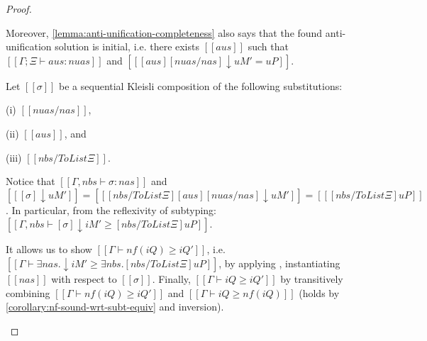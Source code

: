 \begin{proof}
\begin{caseof}
    Moreover, \cref{lemma:anti-unification-completeness} also says that the found anti-unification 
    solution is initial, i.e. there exists $[[aus]]$ such that
     $[[Γ;Ξ ⊢ aus : nuas]]$ and $[[ [aus][nuas/nas]↓uM' = uP ]]$.

     Let $[[σ]]$ be a sequential Kleisli composition of the following
     substitutions:
     \begin{enumerate*}
     \item[(i)] $[[nuas/nas]]$,
     \item[(ii)] $[[aus]]$, and
     \item[(iii)] $[[nbs / ToList Ξ]]$.
     \end{enumerate*}
     Notice that $[[Γ, nbs ⊢ σ : nas]]$
     and $[[ [σ]↓uM' ]] = [[ [nbs / ToList Ξ][aus][nuas/nas]↓uM' ]] = [[ [nbs /
     ToList Ξ]uP ]]$. In particular, from the reflexivity of subtyping:
     $[[Γ, nbs ⊢ [σ]↓iM' ≥ [nbs / ToList Ξ]uP]]$.

     It allows us to show $[[Γ ⊢ nf(iQ) ≥ iQ']]$, i.e. $[[Γ ⊢ ∃nas.↓iM' ≥
     ∃nbs.[nbs / ToList Ξ]uP]]$, by applying ,
     instantiating $[[nas]]$ with respect to $[[σ]]$. Finally, $[[Γ ⊢ iQ ≥ iQ']]$
     by transitively combining $[[Γ ⊢ nf(iQ) ≥ iQ']]$ and $[[Γ ⊢ iQ ≥ nf(iQ)]]$ 
     (holds by \cref{corollary:nf-sound-wrt-subt-equiv} and inversion).
  \end{caseof}
\end{proof}
